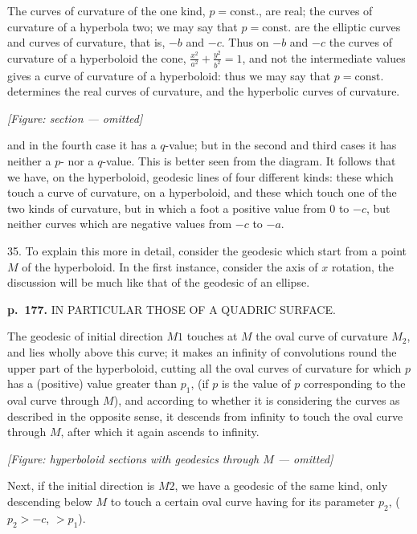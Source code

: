 \documentclass[11pt,a4paper]{book}
\begin{document}
The curves of curvature of the one kind, $p = \mathrm{const.}$, are real; the curves of curvature of a hyperbola two; we may say that $p = \mathrm{const.}$ are the elliptic curves and curves of curvature, that is, $-b$ and $-c$. Thus on $-b$ and $-c$ the curves of curvature of a hyperboloid the cone, $\frac{x^2}{a^2} + \frac{y^2}{b^2} = 1$, and not the intermediate values gives a curve of curvature of a hyperboloid: thus we may say that $p = \mathrm{const.}$ determines the real curves of curvature, and the hyperbolic curves of curvature.

\begin{center}
\textit{[Figure: section --- omitted]}
\end{center}

and in the fourth case it has a $q$-value; but in the second and third cases it has neither a $p$- nor a $q$-value.  This is better seen from the diagram.  It follows that we have, on the hyperboloid, geodesic lines of four different kinds: these which touch a curve of curvature, on a hyperboloid, and these which touch one of the two kinds of curvature, but in which a foot a positive value from $0$ to $-c$, but neither curves which are negative values from $-c$ to $-a$.

35. To explain this more in detail, consider the geodesic which start from a point $M$ of the hyperboloid.  In the first instance, consider the axis of $x$ rotation, the discussion will be much like that of the geodesic of an ellipse.

\clearpage

\noindent
\textbf{p.~177.}  IN PARTICULAR THOSE OF A QUADRIC SURFACE.

The geodesic of initial direction $M1$ touches at $M$ the oval curve of curvature $M_2$, and lies wholly above this curve; it makes an infinity of convolutions round the upper part of the hyperboloid, cutting all the oval curves of curvature for which $p$ has a (positive) value greater than $p_1$, (if $p$ is the value of $p$ corresponding to the oval curve through $M$), and according to whether it is considering the curves as described in the opposite sense, it descends from infinity to touch the oval curve through $M$, after which it again ascends to infinity.

\begin{center}
\textit{[Figure: hyperboloid sections with geodesics through $M$ --- omitted]}
\end{center}

Next, if the initial direction is $M2$, we have a geodesic of the same kind, only descending below $M$ to touch a certain oval curve having for its parameter $p_2$, ($p_2 > -c$, $> p_1$).
\end{document}
